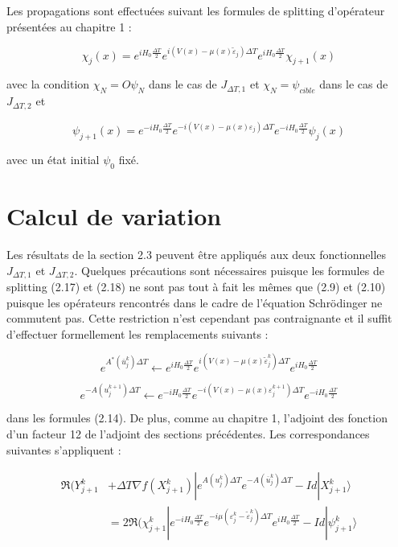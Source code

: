 Les propagations sont effectuées suivant les formules de splitting d'opérateur présentées au chapitre 1 :

\begin{equation}
\chi_j(x) = e^{iH_0\frac{\Delta T}{2}} e^{i(V(x)-\mu(x)\tilde{\varepsilon}_j)\Delta T} e^{iH_0\frac{\Delta T}{2}} \chi_{j+1}(x)
\end{equation}

avec la condition $\chi_N = O\psi_N$ dans le cas de $J_{\Delta T,1}$ et $\chi_N = \psi_{cible}$ dans le cas de $J_{\Delta T,2}$ et

\begin{equation}
\psi_{j+1}(x) = e^{-iH_0\frac{\Delta T}{2}} e^{-i(V(x)-\mu(x)\varepsilon_j)\Delta T} e^{-iH_0\frac{\Delta T}{2}} \psi_j(x)
\end{equation}

avec un état initial $\psi_0$ fixé.

\section{Calcul de variation}

Les résultats de la section 2.3 peuvent être appliqués aux deux fonctionnelles $J_{\Delta T,1}$ et $J_{\Delta T,2}$. Quelques précautions sont nécessaires puisque les formules de splitting (2.17) et (2.18) ne sont pas tout à fait les mêmes que (2.9) et (2.10) puisque les opérateurs rencontrés dans le cadre de l’équation Schrödinger ne commutent pas. Cette restriction n'est cependant pas contraignante et il suffit d'effectuer formellement les remplacements suivants :

$$ e ^{A^*(\overline{u}^k_j)\Delta T} \longleftarrow  e^{iH_0\frac{\Delta T}{2}} e^{i(V(x)-\mu(x)\tilde{\varepsilon}_j^k)\Delta T} e^{iH_0\frac{\Delta T}{2}}$$

$$ e ^{-A(u_j^{k+1})\Delta T} \longleftarrow  e^{-iH_0\frac{\Delta T}{2}} e^{-i(V(x)-\mu(x)\varepsilon_j^{k+1})\Delta T} e^{-iH_0\frac{\Delta T}{2}}$$

dans les formules (2.14). De plus, comme au chapitre 1, l'adjoint des fonction d'un facteur 12 de l'adjoint des sections précédentes. Les correspondances suivantes s'appliquent :

\begin{align*}
\Re(Y^k_{j+1} &+ \Delta T \nabla f(X^k_{j+1})|e^{A(u^k_j)\Delta T} e^{-A(\overline{u}^k_j)\Delta T}-Id|X^k_{j+1}\rangle\\
& = 2 \Re(\chi^k_{j+1}| e^{ -iH_0 \frac{\Delta T}{2}} e^{-i\mu (\varepsilon^k_j - \tilde{\varepsilon}^k_j)\Delta T} e^{ iH_0 \frac{\Delta T}{2}} -Id|\psi^k_{j+1}\rangle
\end{align*}

